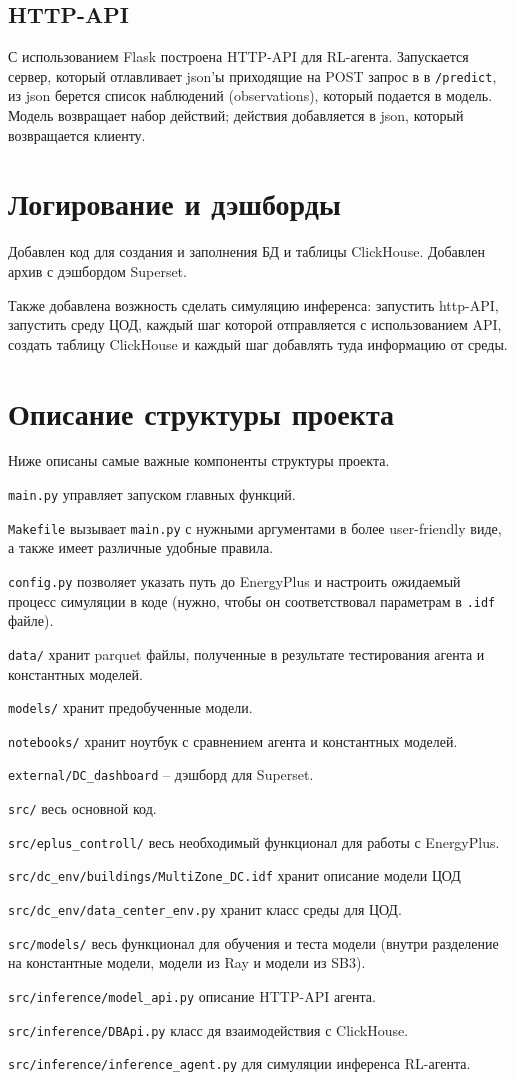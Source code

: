 \documentclass{article}
\begin{document}
\subsection{HTTP-API}
С использованием Flask построена HTTP-API для RL-агента. Запускается сервер, который отлавливает json'ы приходящие на POST запрос в в \Verb+/predict+, из json берется список наблюдений (observations), который подается в модель. Модель возвращает набор действий; действия добавляется в json, который возвращается клиенту.

\section{Логирование и дэшборды}
Добавлен код для создания и заполнения БД и таблицы ClickHouse. Добавлен архив с дэшбордом Superset.

Также добавлена возжность сделать симуляцию инференса: запустить http-API, запустить среду ЦОД, каждый шаг которой отправляется с использованием API, создать таблицу ClickHouse и каждый шаг добавлять туда информацию от среды.

\section{Описание структуры проекта}

Ниже описаны самые важные компоненты структуры проекта.

\Verb+main.py+ управляет запуском главных функций.

\Verb+Makefile+ вызывает \Verb+main.py+ с нужными аргументами в более user-friendly виде, а также имеет различные удобные правила.

\Verb+config.py+ позволяет указать путь до EnergyPlus и настроить ожидаемый процесс симуляции в коде (нужно, чтобы он соответствовал параметрам в \Verb+.idf+ файле).

\Verb+data/+ хранит parquet файлы, полученные в результате тестирования агента и константных моделей.

\Verb+models/+ хранит предобученные модели.

\Verb+notebooks/+ хранит ноутбук с сравнением агента и константных моделей.

\Verb+external/DC_dashboard+ -- дэшборд для Superset.

\Verb+src/+ весь основной код.

\Verb+src/eplus_controll/+ весь необходимый функционал для работы с EnergyPlus.

\Verb+src/dc_env/buildings/MultiZone_DC.idf+ хранит описание модели ЦОД

\Verb+src/dc_env/data_center_env.py+ хранит класс среды для ЦОД.

\Verb+src/models/+ весь функционал для обучения и теста модели (внутри разделение на константные модели, модели из Ray и модели из SB3).

\Verb+src/inference/model_api.py+ описание HTTP-API агента.

\Verb+src/inference/DBApi.py+ класс дя взаимодействия с ClickHouse.

\Verb+src/inference/inference_agent.py+ для симуляции инференса RL-агента.
\end{document}

